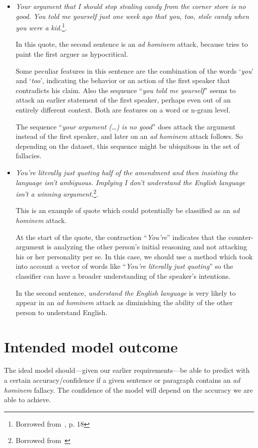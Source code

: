 \documentclass[a4paper]{article}
\begin{document}
\begin{itemize}
    \item \emph{Your argument that I should stop stealing candy from the corner store is no good. You told me yourself just one week ago that you, too, stole candy when you were a kid.}\footnote{Borrowed from~\cite{Walton1998}, p. 18}.
    
    In this quote, the second sentence is an \emph{ad hominem} attack, because tries to paint the first arguer as hypocritical. 

    Some peculiar features in this sentence are the combination of the words `\emph{you}' and `\emph{too}', indicating the behavior or an action of the first speaker  that contradicts his claim. Also the sequence ``\emph{you told me yourself}'' seems to attack an earlier statement of the first speaker, perhaps even out of an entirely different context. Both are features on a word or n-gram level.

    The sequence ``\emph{your argument (\dots) is no good}'' does attack the argument instead of the first speaker, and later on an \emph{ad hominem} attack follows. So depending on the dataset, this sequence might be ubiquitous in the set of fallacies.
    
    \item \emph{You're literally just quoting half of the amendment and then insisting the language isn't ambiguous. Implying I don't understand the English language isn't a winning argument.}\footnote{Borrowed from~\cite{Habernal.et.al.2018.NAACL.adhominem}}.
    
    This is an example of quote which could potentially be classified as an \emph{ad hominem} attack.
    
    At the start of the quote, the contraction ``\emph{You're}'' indicates that the counter-argument is analyzing the other person's initial reasoning and not attacking his or her personality per se. In this case, we should use a method which took into account a vector of words like ``\emph{You're literally just quoting}'' so the classifier can have a broader understanding of the speaker's intentions.
    
    In the second sentence, \emph{understand the English language} is very likely to appear in an \emph{ad hominem} attack as diminishing the ability of the other person to understand English. 
    
\end{itemize}
 
\section{Intended model outcome}
The ideal model should---given our earlier requirements---be able to predict with a certain accuracy/confidence if a given sentence or paragraph contains an \emph{ad hominem} fallacy. The confidence of the model will depend on the accuracy we are able to achieve. 
\end{document}
